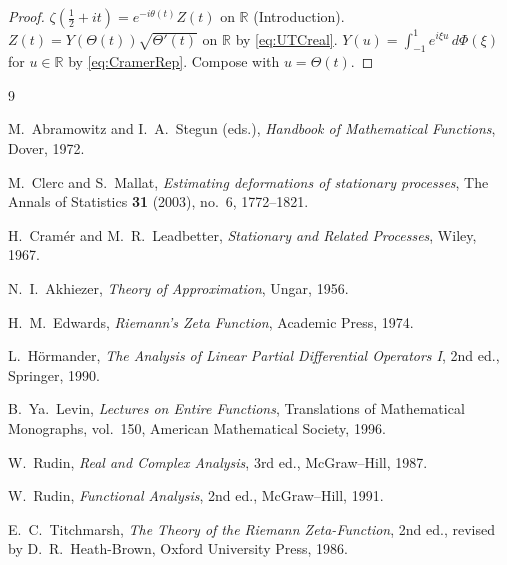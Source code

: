\documentclass[11pt]{article}
\begin{document}
\begin{proof}
$\zeta(\tfrac{1}{2}+it)=e^{-i\theta(t)}Z(t)$ on $\mathbb R$ (Introduction). $Z(t)=Y(\Theta(t))\sqrt{\Theta'(t)}$ on $\mathbb R$ by \eqref{eq:UTCreal}. $Y(u)=\int_{-1}^{1}e^{i\xi u}\,d\Phi(\xi)$ for $u\in\mathbb R$ by \eqref{eq:CramerRep}. Compose with $u=\Theta(t)$.
\end{proof}

\appendix
\begin{thebibliography}{9}

M.~Abramowitz and I.~A.~Stegun (eds.), \emph{Handbook of Mathematical Functions}, Dover, 1972.

M.~Clerc and S.~Mallat, \emph{Estimating deformations of stationary processes}, The Annals of Statistics \textbf{31} (2003), no.~6, 1772--1821.

H.~Cram\'er and M.~R.~Leadbetter, \emph{Stationary and Related Processes}, Wiley, 1967.

N.~I.~Akhiezer, \emph{Theory of Approximation}, Ungar, 1956.

H.~M.~Edwards, \emph{Riemann's Zeta Function}, Academic Press, 1974.

L.~H\"ormander, \emph{The Analysis of Linear Partial Differential Operators I}, 2nd ed., Springer, 1990.

B.~Ya.~Levin, \emph{Lectures on Entire Functions}, Translations of Mathematical Monographs, vol.~150, American Mathematical Society, 1996.

W.~Rudin, \emph{Real and Complex Analysis}, 3rd ed., McGraw--Hill, 1987.

W.~Rudin, \emph{Functional Analysis}, 2nd ed., McGraw--Hill, 1991.

E.~C.~Titchmarsh, \emph{The Theory of the Riemann Zeta-Function}, 2nd ed., revised by D.~R.~Heath-Brown, Oxford University Press, 1986.

\end{thebibliography}
\end{document}
